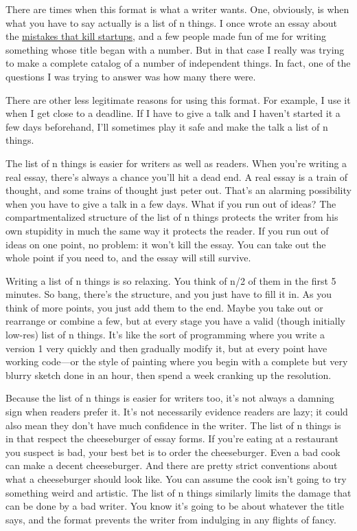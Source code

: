 \documentclass[12pt]{book}
\begin{document}
There are times when this format is what a writer wants. One, obviously,
is when what you have to say actually is a list of n things. I once
wrote an essay about the \href{startupmistakes.html}{mistakes that kill
startups}, and a few people made fun of me for writing something whose
title began with a number. But in that case I really was trying to make
a complete catalog of a number of independent things. In fact, one of
the questions I was trying to answer was how many there were.

There are other less legitimate reasons for using this format. For
example, I use it when I get close to a deadline. If I have to give a
talk and I haven't started it a few days beforehand, I'll sometimes play
it safe and make the talk a list of n things.

The list of n things is easier for writers as well as readers. When
you're writing a real essay, there's always a chance you'll hit a dead
end. A real essay is a train of thought, and some trains of thought just
peter out. That's an alarming possibility when you have to give a talk
in a few days. What if you run out of ideas? The compartmentalized
structure of the list of n things protects the writer from his own
stupidity in much the same way it protects the reader. If you run out of
ideas on one point, no problem: it won't kill the essay. You can take
out the whole point if you need to, and the essay will still survive.

Writing a list of n things is so relaxing. You think of n/2 of them in
the first 5 minutes. So bang, there's the structure, and you just have
to fill it in. As you think of more points, you just add them to the
end. Maybe you take out or rearrange or combine a few, but at every
stage you have a valid (though initially low-res) list of n things. It's
like the sort of programming where you write a version 1 very quickly
and then gradually modify it, but at every point have working code---or
the style of painting where you begin with a complete but very blurry
sketch done in an hour, then spend a week cranking up the resolution.

Because the list of n things is easier for writers too, it's not always
a damning sign when readers prefer it. It's not necessarily evidence
readers are lazy; it could also mean they don't have much confidence in
the writer. The list of n things is in that respect the cheeseburger of
essay forms. If you're eating at a restaurant you suspect is bad, your
best bet is to order the cheeseburger. Even a bad cook can make a decent
cheeseburger. And there are pretty strict conventions about what a
cheeseburger should look like. You can assume the cook isn't going to
try something weird and artistic. The list of n things similarly limits
the damage that can be done by a bad writer. You know it's going to be
about whatever the title says, and the format prevents the writer from
indulging in any flights of fancy.
\end{document}
